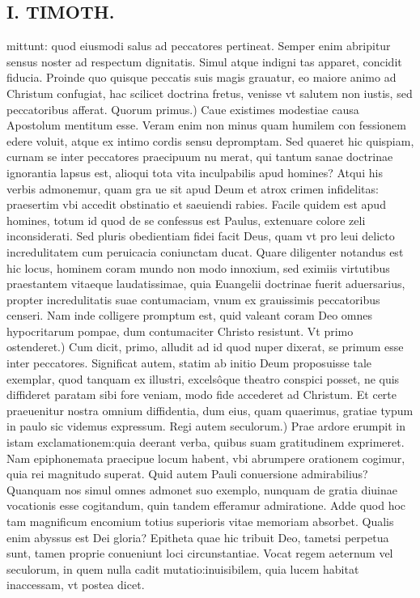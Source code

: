 \documentclass{article}
\begin{document}
\begin{pages}
\section*{I. TIMOTH. }
\marginpar{[ p.12 ]}\pstart mittunt: quod eiusmodi salus ad peccatores pertineat. Semper enim abripitur sensus noster ad respectum dignitatis. Simul atque indigni tas apparet, concidit fiducia. Proinde quo quisque peccatis suis magis grauatur, eo maiore animo ad Christum confugiat, hac scilicet doctrina fretus, venisse vt salutem non iustis, sed peccatoribus afferat.  \pend\pstart Quorum primus.) Caue existimes modestiae causa Apostolum mentitum esse. Veram enim non minus quam humilem con fessionem edere voluit, atque ex intimo cordis sensu depromptam. Sed quaeret hic quispiam, curnam se inter peccatores praecipuum nu merat, qui tantum sanae doctrinae ignorantia lapsus est, alioqui tota vita inculpabilis apud homines? Atqui his verbis admonemur, quam gra ue sit apud Deum et atrox crimen infidelitas: praesertim vbi accedit obstinatio et saeuiendi rabies. Facile quidem est apud homines, totum id quod de se confessus est Paulus, extenuare colore zeli inconsiderati. Sed pluris obedientiam fidei facit Deus, quam vt pro leui delicto incredulitatem cum peruicacia coniunctam ducat. Quare diligenter notandus est hic locus, hominem coram mundo non modo innoxium, sed eximiis virtutibus praestantem vitaeque laudatissimae, quia Euangelii doctrinae fuerit aduersarius, propter incredulitatis suae contumaciam, vnum ex grauissimis peccatoribus censeri. Nam inde colligere promptum est, quid valeant coram Deo omnes hypocritarum pompae, dum contumaciter Christo resistunt.  \pend\pstart Vt primo ostenderet.) Cum dicit, primo, alludit ad id quod nuper dixerat, se primum esse inter peccatores. Significat autem, statim ab initio Deum proposuisse tale exemplar, quod tanquam ex illustri, excelsôque theatro conspici posset, ne quis diffideret paratam sibi fore veniam, modo fide accederet ad Christum. Et certe praeuenitur nostra omnium diffidentia, dum eius, quam quaerimus, gratiae typum in paulo sic videmus expressum.  \pend\pstart Regi autem seculorum.) Prae ardore erumpit in istam exclamationem:quia deerant verba, quibus suam gratitudinem exprimeret. Nam epiphonemata praecipue locum habent, vbi abrumpere orationem cogimur, quia rei magnitudo superat. Quid autem Pauli conuersione admirabilius? Quanquam nos simul omnes admonet suo exemplo, nunquam de gratia diuinae vocationis esse cogitandum, quin tandem efferamur admiratione. Adde quod hoc tam magnificum encomium totius superioris vitae memoriam absorbet. Qualis enim abyssus est Dei gloria? Epitheta quae hic tribuit Deo, tametsi perpetua sunt, tamen proprie conueniunt loci circunstantiae. Vocat regem aeternum vel seculorum, in quem nulla cadit mutatio:inuisibilem, quia lucem habitat inaccessam, vt postea dicet.  \pend

\end{pages}
\end{document}
